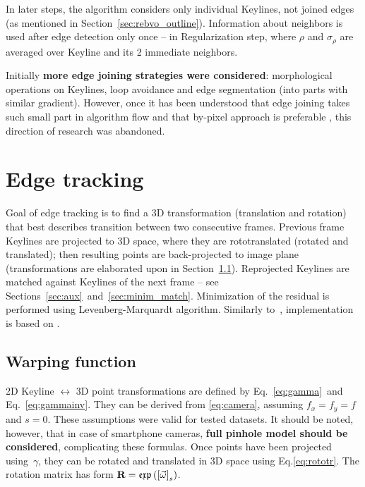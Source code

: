 In later steps, the algorithm considers only individual Keylines, not joined edges (as mentioned in Section~\ref{sec:rebvo_outline}). Information about neighbors is used after edge detection only once -- in Regularization step, where $\rho$ and $\sigma_{\rho}$
are averaged over Keyline and its 2 immediate neighbors.

Initially \textbf{more edge joining strategies were considered}: morphological operations on Keylines, loop avoidance and edge segmentation (into parts with similar gradient). However, once it has been understood that edge joining takes such small part in algorithm flow and that by-pixel approach is preferable \cite{harris}, this direction of research was abandoned.



\section{Edge tracking}

Goal of edge tracking is to find a 3D transformation (translation and rotation) that best describes transition between two consecutive frames. Previous frame Keylines are projected to 3D space, where they are rototranslated (rotated and translated); then resulting points are back-projected to image plane (transformations are elaborated upon in Section~\ref{sec:warp}). Reprojected Keylines are matched against Keylines of the next frame -- see Sections~\ref{sec:aux}~and~\ref{sec:minim_match}. Minimization of the residual is performed using Levenberg-Marquardt algorithm. Similarly to~\cite{jose2015realtime}, implementation is based on \cite{madsen2004methods}.

\subsection{Warping function}
\label{sec:warp}

2D Keyline $\longleftrightarrow$ 3D point transformations are defined by Eq.~\ref{eq:gamma}~and Eq.~\ref{eq:gammainv}. They can be derived from \ref{eq:camera}, assuming $f_x = f_y = f$ and $s = 0$. These assumptions were valid for tested datasets. It should be noted, however, that in case of smartphone cameras, \textbf{full pinhole model should be considered}, complicating these formulas. Once points have been projected using~$\gamma$, they can be rotated and translated in 3D space using Eq.\ref{eq:rototr}. The rotation matrix has form $\textbf{R} = \mathfrak{exp} \left ( \left[ \vec{\omega} \right ]_{s} \right )$.


